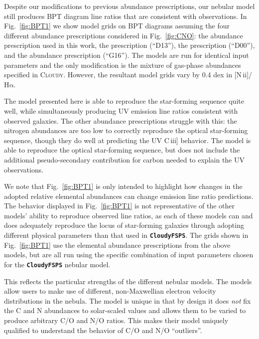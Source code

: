\documentclass[preprint2]{aastex61}
\newcommand{\CloudyFSPS}{{\tt \textbf{CloudyFSPS}}\xspace}
\newcommand{\Cloudy}{\textsc{Cloudy}\xspace}
\newcommand{\nii}{[N\,{\sc ii}]\xspace}
\newcommand{\ciii}{C\,{\sc iii}]\xspace}
\newcommand{\ha}{\ensuremath{\mathrm{H\alpha}}\xspace}
\begin{document}
Despite our modifications to previous abundance prescriptions, our nebular model still produces BPT diagram line ratios that are consistent with observations. In Fig.~\ref{fig:BPT1} we show model grids on BPT diagrams assuming the four different abundance prescriptions considered in Fig.~\ref{fig:CNO}: the abundance prescription used in this work, the \citet{Dopita+2013} prescription (``D13''), the \citet{Dopita+2000} prescription (``D00''), and the \citet{Gutkin+2016} abundance prescription (``G16''). The models are run for identical input parameters and the only modification is the mixture of gas-phase abundances specified in \Cloudy. However, the resultant model grids vary by 0.4 dex in \nii/\ha.

The model presented here is able to reproduce the star-forming sequence quite well, while simultaneously producing UV emission line ratios consistent with observed galaxies. The other abundance prescriptions struggle with this: the \citet{Dopita+2013} nitrogen abundances are too low to correctly reproduce the optical star-forming sequence, though they do well at predicting the UV \ciii behavior. The \citet{Dopita+2000} model is able to reproduce the optical star-forming sequence, but does not include the additional pseudo-secondary contribution for carbon needed to explain the UV observations.

We note that Fig.~\ref{fig:BPT1} is only intended to highlight how changes in the adopted relative elemental abundances can change emission line ratio predictions. The behavior displayed in Fig.~\ref{fig:BPT1} is not representative of the other models' ability to reproduce observed line ratios, as each of these models can and does adequately reproduce the locus of star-forming galaxies through adopting different physical parameters than that used in \CloudyFSPS. The grids shown in Fig.~\ref{fig:BPT1} use the elemental abundance prescriptions from the above models, but are all run using the specific combination of input parameters chosen for the \CloudyFSPS nebular model.

This reflects the particular strengths of the different nebular models. The \citet{Dopita+2013} models allow users to make use of different, non-Maxwellian electron velocity distributions in the nebula. The \citet{Gutkin+2016} model is unique in that by design it does \emph{not} fix the C and N abundances to solar-scaled values and allows them to be varied to produce arbitrary C/O and N/O ratios. This makes their model uniquely qualified to understand the behavior of C/O and N/O ``outliers''.
\end{document}
